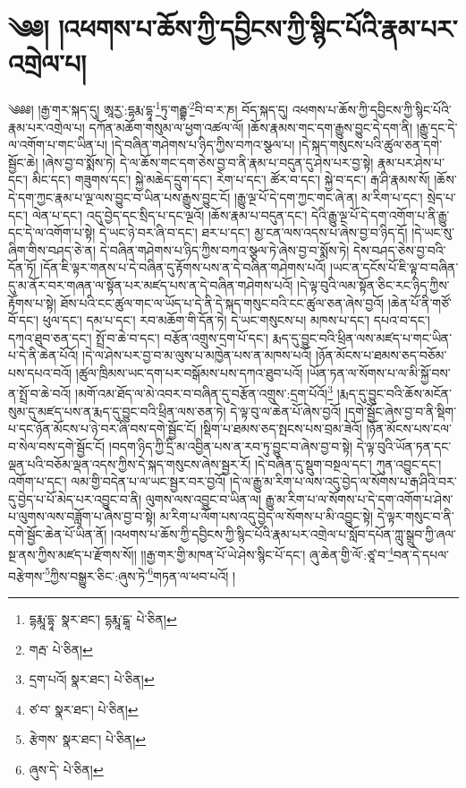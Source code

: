 \setcounter{footnote}{0} 
\chapter{༄༅། །འཕགས་པ་ཆོས་ཀྱི་དབྱིངས་ཀྱི་སྙིང་པོའི་རྣམ་པར་འགྲེལ་པ།}༄༅༅། །རྒྱ་གར་སྐད་དུ། ཨཱརྱ་:དྷརྨ་དྷཱ་\footnote{དྷརྨཱ་དྷཱ་  སྣར་ཐང་། དྷརྨཱ་ངྒཱ་  པེ་ཅིན། }ཏུ་གརྦྷ་\footnote{གརྦ་  པེ་ཅིན། }བི་བ་ར་ཎ། བོད་སྐད་དུ། འཕགས་པ་ཆོས་ཀྱི་དབྱིངས་ཀྱི་སྙིང་པོའི་རྣམ་པར་འགྲེལ་པ། དཀོན་མཆོག་གསུམ་ལ་ཕྱག་འཚལ་ལོ། །ཆོས་རྣམས་གང་དག་རྒྱུས་བྱུང་དེ་དག་ནི། །རྒྱུ་དང་དེ་ལ་འགོག་པ་གང་ཡིན་པ། །དེ་བཞིན་གཤེགས་པ་ཉིད་ཀྱིས་བཀའ་སྩལ་པ། །དེ་སྐད་གསུངས་པའི་ཚུལ་ཅན་དགེ་སྦྱོང་ཆེ། །ཞེས་བྱ་བ་སྨོས་ཏེ། དེ་ལ་ཆོས་གང་དག་ཅེས་བྱ་བ་ནི་རྣམ་པ་བདུན་དུ་ཤེས་པར་བྱ་སྟེ། རྣམ་པར་ཤེས་པ་དང་། མིང་དང་། གཟུགས་དང་། སྐྱེ་མཆེད་དྲུག་དང་། རེག་པ་དང་། ཚོར་བ་དང་། སྐྱེ་བ་དང་། རྒ་ཤི་རྣམས་སོ། །ཆོས་དེ་དག་ཀྱང་རྣམ་པ་ལྔ་ལས་བྱུང་བ་ཡིན་པས་རྒྱུས་བྱུང་ངོ། །རྒྱུ་ལྔ་པོ་དེ་དག་ཀྱང་གང་ཞེ་ན། མ་རིག་པ་དང་། སྲེད་པ་དང་། ལེན་པ་དང་། འདུ་བྱེད་དང་སྲིད་པ་དང་ལྔའོ། །ཆོས་རྣམ་པ་བདུན་དང་། དེའི་རྒྱུ་ལྔ་པོ་དེ་དག་འགོག་པ་ནི་རྒྱུ་དང་དེ་ལ་འགོག་པ་སྟེ། དེ་ཡང་ཉེ་བར་ཞི་བ་དང་། ཐར་པ་དང་། མྱ་ངན་ལས་འདས་པ་ཞེས་བྱ་བ་ཉིད་དོ། །དེ་ཡང་སུ་ཞིག་གིས་བཤད་ཅེ་ན། དེ་བཞིན་གཤེགས་པ་ཉིད་ཀྱིས་བཀའ་སྩལ་ཏེ་ཞེས་བྱ་བ་སྨོས་ཏེ། དེས་བཤད་ཅེས་བྱ་བའི་དོན་ཏོ། །དོན་ཇི་ལྟར་གནས་པ་དེ་བཞིན་དུ་རྟོགས་པས་ན་དེ་བཞིན་གཤེགས་པའོ། །ཡང་ན་དངོས་པོ་ཇི་ལྟ་བ་བཞིན་དུ་མ་ནོར་བར་གཞན་ལ་སྟོན་པར་མཛད་པས་ན་དེ་བཞིན་གཤེགས་པའོ། །དེ་ལྟ་བུའི་ལམ་སྟོན་ཅིང་རང་ཉིད་ཀྱིས་རྟོགས་པ་སྟེ། ཐོས་པའི་ངང་ཚུལ་གང་ལ་ཡོད་པ་དེ་ནི་དེ་སྐད་གསུང་བའི་ངང་ཚུལ་ཅན་ཞེས་བྱའོ། །ཆེན་པོ་ནི་གཙོ་བོ་དང་། ཕུལ་དང་། དམ་པ་དང་། རབ་མཆོག་གི་དོན་ཏེ། དེ་ཡང་གསུངས་པ། མཁས་པ་དང་། དཔའ་བ་དང་། དཀའ་ཐུབ་ཅན་དང་། སྤྲོ་བ་ཆེ་བ་དང་། བརྩོན་འགྲུས་དྲག་པོ་དང་། རྨད་དུ་བྱུང་བའི་ཕྲིན་ལས་མཛད་པ་གང་ཡིན་པ་དེ་ནི་ཆེན་པོའོ། །དེ་ལ་ཤེས་པར་བྱ་བ་མ་ལུས་པ་མཁྱེན་པས་ན་མཁས་པའོ། །ཉོན་མོངས་པ་ཐམས་ཅད་བཅོམ་པས་དཔའ་བའོ། །ཚུལ་ཁྲིམས་ཡང་དག་པར་བསྒོམས་པས་དཀའ་ཐུབ་པའོ། །ཡོན་ཏན་ལ་སོགས་པ་ལ་མི་སྐྱོ་བས་ན་སྤྲོ་བ་ཆེ་བའོ། །མགོ་འམ་ཐོད་ལ་མེ་འབར་བ་བཞིན་དུ་བརྩོན་འགྲུས་:དྲག་པོའོ།\footnote{དྲག་པའོ།  སྣར་ཐང་།  པེ་ཅིན། } །རྨད་དུ་བྱུང་བའི་ཆོས་མངོན་སུམ་དུ་མཛད་པས་ན་རྨད་དུ་བྱུང་བའི་ཕྲིན་ལས་ཅན་ཏེ། དེ་ལྟ་བུ་ལ་ཆེན་པོ་ཞེས་བྱའོ། །དགེ་སྦྱོང་ཞེས་བྱ་བ་ནི་སྡིག་པ་དང་ཉོན་མོངས་པ་ཉེ་བར་ཞི་བས་དགེ་སྦྱོང་ངོ། །སྡིག་པ་ཐམས་ཅད་སྤངས་པས་བྲམ་ཟེའོ། །ཉོན་མོངས་པས་ངལ་བ་སེལ་བས་དགེ་སྦྱོང་ངོ། །བདག་ཉིད་ཀྱི་དྲི་མ་འབྱིན་པས་ན་རབ་ཏུ་བྱུང་བ་ཞེས་བྱ་བ་སྟེ། དེ་ལྟ་བུའི་ཡོན་ཏན་དང་ལྡན་པའི་བཅོམ་ལྡན་འདས་ཀྱིས་དེ་སྐད་གསུངས་ཞེས་སྦྱར་རོ། །དེ་བཞིན་དུ་སྡུག་བསྔལ་དང་། ཀུན་འབྱུང་དང་། འགོག་པ་དང་། ལམ་གྱི་བདེན་པ་ལ་ཡང་སྦྱར་བར་བྱའོ། །དེ་ལ་རྒྱུ་མ་རིག་པ་ལས་འདུ་བྱེད་ལ་སོགས་པ་རྒ་ཤིའི་བར་དུ་བྱེད་པ་པོ་མེད་པར་འབྱུང་བ་ནི། ལུགས་ལས་འབྱུང་བ་ཡིན་ལ། རྒྱུ་མ་རིག་པ་ལ་སོགས་པ་དེ་དག་འགོག་པ་ཤེས་པ་ལུགས་ལས་བཟློག་པ་ཞེས་བྱ་བ་སྟེ། མ་རིག་པ་ལོག་པས་འདུ་བྱེད་ལ་སོགས་པ་མི་འབྱུང་སྟེ། དེ་ལྟར་གསུང་བ་ནི་དགེ་སྦྱོང་ཆེན་པོ་ཡིན་ནོ། །འཕགས་པ་ཆོས་ཀྱི་དབྱིངས་ཀྱི་སྙིང་པོའི་རྣམ་པར་འགྲེལ་པ་སློབ་དཔོན་ཀླུ་སྒྲུབ་ཀྱི་ཞལ་སྔ་ནས་ཀྱིས་མཛད་པ་རྫོགས་སོ།། །།རྒྱ་གར་གྱི་མཁན་པོ་ཡེ་ཤེས་སྙིང་པོ་དང་། ཞུ་ཆེན་གྱི་ལོ་:ཙཱ་བ་\footnote{ཙ་བ་  སྣར་ཐང་།  པེ་ཅིན། }བན་དེ་དཔལ་བརྩེགས་\footnote{རྩེགས་  སྣར་ཐང་།  པེ་ཅིན། }ཀྱིས་བསྒྱུར་ཅིང་:ཞུས་ཏེ་\footnote{ཞུས་དེ་  པེ་ཅིན། }གཏན་ལ་ཕབ་པའོ། ། 